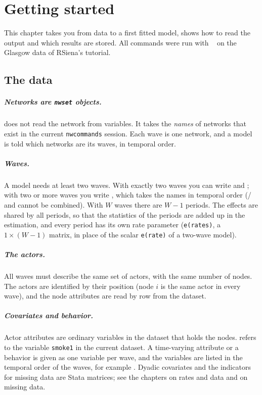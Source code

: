 \chapter{Getting started}\label{ch:start}

This chapter takes you from data to a first fitted model, shows how to read the output and which results are stored. All commands were run with \nwsaom{}~\pkgversion{} on the Glasgow data of RSiena's tutorial.

\section{The data}

\paragraph{Networks are \texttt{nwset} objects.} \nwsaom{} does not read the network from variables. It takes the \emph{names} of networks that exist in the current \texttt{nwcommands} session. Each wave is one network, and a model is told which networks are its waves, in temporal order.

\paragraph{Waves.} A model needs at least two waves. With exactly two waves you can write  and ; with two or more waves you write , which takes the names in temporal order (/ and  cannot be combined). With $W$ waves there are $W-1$ periods. The effects are shared by all periods, so that the statistics of the periods are added up in the estimation, and every period has its own rate parameter (\texttt{e(rates)}, a $1\times(W-1)$ matrix, in place of the scalar \texttt{e(rate)} of a two-wave model).

\paragraph{The actors.} All waves must describe the same set of actors, with the same number of nodes. The actors are identified by their position (node $i$ is the same actor in every wave), and the node attributes are read by row from the dataset.

\paragraph{Covariates and behavior.} Actor attributes are ordinary variables in the dataset that holds the nodes.  refers to the variable \texttt{smoke1} in the current dataset. A time-varying attribute or a behavior is given as one variable per wave, and the variables are listed in the temporal order of the waves, for example . Dyadic covariates and the indicators for missing data are Stata matrices; see the chapters on rates and data and on missing data.

